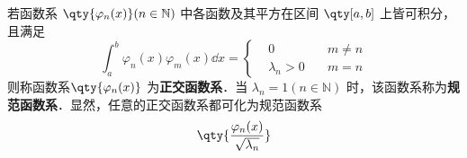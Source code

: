
若函数系 $\qty{\varphi_n(x)}(n\in \mathbb{N})$ 中各函数及其平方在区间 $\qty[a,b]$ 上皆可积分，且满足
\begin{equation}
\int_a^b\varphi_n(x)\varphi_m(x)\dd x=
\left\{
    \begin{aligned}
    &0\quad &m\neq n\\
   &\lambda_n>0\quad &m=n
    \end{aligned}
\right.
\end{equation}
则称函数系$\qty{\varphi_n(x)}$ 为\textbf{正交函数系}．当 $\lambda_n=1(n\in\mathbb{N})$ 时，该函数系称为\textbf{规范函数系}．显然，任意的正交函数系都可化为规范函数系 
\begin{equation}
\qty{\frac{\varphi_n(x)}{\sqrt{\lambda_n}}}
\end{equation}

